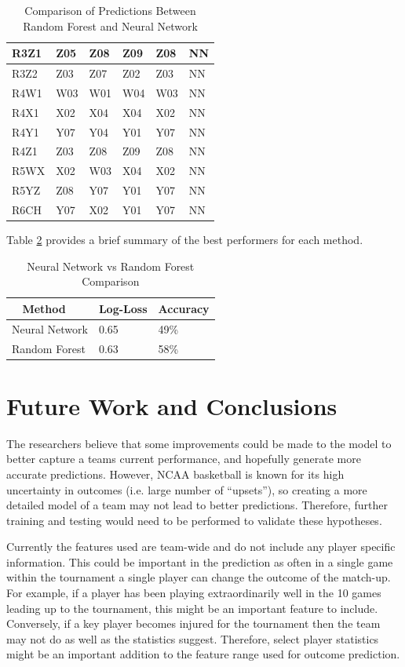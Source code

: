 \documentclass[conference]{IEEEtran}
\begin{document}
{\begin{table}[H]
\begin{tabular}{|l|l|l|l|l|l|}
R3Z1 & Z05 & Z08 & Z09 & Z08 &  NN  \\ \hline
R3Z2 & Z03 & Z07 & Z02 & Z03 &  NN  \\ \hline
R4W1 & W03 & W01 & W04 & W03 &  NN  \\ \hline
R4X1 & X02 & X04 & X04 & X02 &  NN  \\ \hline
R4Y1 & Y07 & Y04 & Y01 & Y07 &  NN  \\ \hline
R4Z1 & Z03 & Z08 & Z09 & Z08 &  NN  \\ \hline
R5WX & X02 & W03 & X04 & X02 &  NN  \\ \hline
R5YZ & Z08 & Y07 & Y01 & Y07 &  NN  \\ \hline
R6CH & Y07 & X02 & Y01 & Y07 &  NN  \\ \hline
    \end{tabular}
    \caption {Comparison of Predictions Between Random Forest and Neural Network}
    \label{tab:comparison}
\end{table}

Table \ref{tab:nn-rf} provides a brief summary of the best performers for each method.
\begin{table}[H]
	\centering
    \begin{tabular}{|l|l|l|}
    \hline
    ~   \textbf{Method} & \textbf{Log-Loss} & \textbf{Accuracy}\\ \hline
    	Neural Network		& 0.65 				& 49\% \\ \hline
    	Random Forest 		& 0.63 				& 58\% \\ \hline	
    \end{tabular}
    \caption {Neural Network vs Random Forest Comparison}
    \label{tab:nn-rf}
\end{table}
\section{Future Work and Conclusions}
The researchers believe that some improvements could be made to the model to better capture a teams current performance, and hopefully generate more accurate predictions. 
However, NCAA basketball is known for its high uncertainty in outcomes (i.e. large number of ``upsets''), so creating a more detailed model of a team may not lead to better predictions.
Therefore, further training and testing would need to be performed to validate these hypotheses.

Currently the features used are team-wide and do not include any player specific information. 
This could be important in the prediction as often in a single game within the tournament a single player can change the outcome of the match-up.
For example, if a player has been playing extraordinarily well in the 10 games leading up to the tournament, this might be an important feature to include.
Conversely, if a key player becomes injured for the tournament then the team may not do as well as the statistics suggest.
Therefore, select player statistics might be an important addition to the feature range used for outcome prediction.

}
\end{document}

